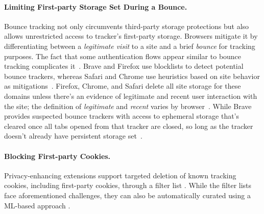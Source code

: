\vspace{-1mm}
\paragraph{Limiting First-party Storage Set During a Bounce.}
%
Bounce tracking not only circumvents third-party storage protections but also allows unrestricted access to tracker’s first-party storage. 
%
Browsers mitigate it by differentiating between a \textit{legitimate visit} to a site and a brief \textit{bounce} for tracking purposes. 
%
The fact that some authentication flows appear similar to bounce tracking complicates it~\cite{kellyBounceTrackingMitigations2022}. 
%
Brave and Firefox use blocklists to detect potential bounce trackers, whereas Safari and Chrome use heuristics based on site behavior as mitigations~\cite{snyderNavigationalTrackingMitigations2024}. 
%
Firefox, Chrome, and Safari delete all site storage for these domains unless there's an evidence of legitimate and recent user interaction with the site; the definition of \textit{legitimate} and \textit{recent} varies by browser~\cite{snyderNavigationalTrackingMitigations2024,TrackingPreventionWebKit2020}. 
%
While Brave provides suspected bounce trackers with access to ephemeral storage that’s cleared once all tabs opened from that tracker are closed, so long as the tracker doesn’t already have persistent storage set~\cite{braveprivacyteamUnlinkableBouncingMore2022}.

\vspace{-1mm}
\paragraph{Blocking First-party Cookies.}
Privacy-enhancing extensions support targeted deletion of known tracking cookies, including first-party cookies, through a filter list \cite{ublockResourcesLibrary,adguardrteamScriptletsWikiAboutscriptletsmd,schininaSourceBehavioralCookieremoverjs2024}.
%
While the filter lists face aforementioned challenges, they can also be automatically curated using a ML-based approach \cite{munirCookieGraphUnderstandingDetecting2023,bollingerAutomatingCookieConsent2022,schoniBlockCookiesNot2024a}.